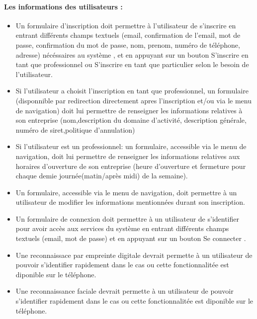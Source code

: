 \documentclass{article}
\begin{document}
\paragraph{Les informations des utilisateurs :}
\begin{itemize}
 \item Un formulaire d'inscription doit permettre à l'utilisateur de
   s'inscrire en entrant différents champs textuels (email,
   confirmation de l'email, mot de
   passe, confirmation du mot de passe, nom, prenom, numéro de téléphone, adresse) nécéssaires au
   système , et en appuyant sur
   un bouton \og S'inscrire en tant que professionnel\fg{} ou \og S'inscrire en tant que particulier\fg{} selon le besoin de l'utilisateur.

\item Si l'utilisateur a choisit l'inscription en tant que professionnel, un formulaire (disponnible par redirection 
directement apres l'inscription et/ou via le menu de navigation) doit lui permettre de renseigner les informations relatives 
à son entreprise (nom,description du domaine d'activité, description générale, numéro de siret,politique d'annulation)

\item Si l'utilisateur est un professionnel: un formulaire, accessible via le menu de navigation,  doit lui permettre de renseigner les informations relatives aux 
horaires d'ouverture de son entreprise (heure d'ouverture et fermeture pour chaque demie journée(matin/après midi) de la semaine).

\item Un formulaire, accessible via le menu de navigation, doit permettre à un utilisateur de modifier les
  informations mentionnées durant son inscription.
\item Un formulaire de connexion doit permettre à un utilisateur de
  s'identifier pour avoir accès aux services du système en entrant
  différents champs textuels (email, mot de passe) et en appuyant sur
  un bouton \og Se connecter \fg{}.

\item Une reconnaissace par empreinte digitale devrait permette à un
  utilisateur de pouvoir s'identifier rapidement dans le cas ou cette
  fonctionnalitée est diponible sur le téléphone.
\item Une reconnaissance faciale devrait permette à un
  utilisateur de pouvoir s'identifier rapidement dans le cas ou cette
  fonctionnalitée est diponible sur le téléphone.
\end{itemize}
\end{document}
